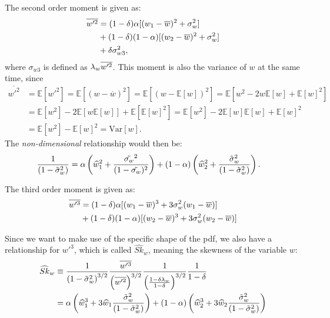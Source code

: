 The second order moment is given as:
\begin{align}
    \label{eq:wp2_bar}
    \overline{w'^2}
    &= (1 - \delta) \alpha [(w_1 - \overline{w})^2 + \sigma_w^2] \nonumber\\
    &+ (1 - \delta) (1 - \alpha) [(w_2 - \overline{w})^2 + \sigma_w^2] \nonumber\\
    &+ \delta \sigma_{w 3}^2,
\end{align}
where $\sigma_{w 3}$ is defined as $\lambda_w \overline{w'^2}$.
This moment is also the variance of $w$ at the same time, since
\begin{align*}
    \overline{w'^2}
    &= \mathbb{E}[w'^2]
    = \mathbb{E}[(w - \overline{w})^2]
    = \mathbb{E}[(w - \mathbb{E}[w])^2]
    = \mathbb{E}[w^2 -2w\mathbb{E}[w] + \mathbb{E}[w]^2] \\
    &= \mathbb{E}[w^2] - 2\mathbb{E}[w\mathbb{E}[w]] + \mathbb{E}[\mathbb{E}[w]^2]
    = \mathbb{E}[w^2] - 2\mathbb{E}[w]\mathbb{E}[w] + \mathbb{E}[w]^2 \\
    &= \mathbb{E}[w^2] - \mathbb{E}[w]^2
    = \text{Var}[w].
\end{align*}
The \emph{non-dimensional} relationship would then be:
\begin{align}
    \label{eq:wp2_bar_non_dim}
    \frac{1}{\left( 1 - \tilde{\sigma}_w^2 \right)}
    &= \alpha \left(\widehat{w}_1^2 + \frac{\tilde{\sigma_w}^2}{(1 - \tilde{\sigma_w})^2} \right)
    + (1-\alpha) \left( \widehat{w}_2^2 + \frac{{\tilde{\sigma}_w}^2}{\left( 1 - \tilde{\sigma}_w^2 \right)} \right).
\end{align}

The third order moment is given as:
\begin{align}
    \label{eq:wp3_bar}
    \overline{w'^3}
    &= (1 - \delta) \alpha [(w_1 - \overline{w})^3 + 3 \sigma_w^2 (w_1 - \overline{w})] \nonumber\\
    &+ (1 - \delta) (1 - \alpha) [(w_2 - \overline{w})^3 + 3 \sigma_w^2 (w_2 - \overline{w})]
\end{align}

Since we want to make use of the specific shape of the \gls{pdf},
we also have a relationship for $w'^3$,
which is called $\widehat{Sk}_w$, meaning the skewness of the variable $w$:
\begin{align}
    \widehat{Sk}_w
    &\equiv \frac{1}{\left( 1 - \tilde{\sigma}_w^2 \right)^{3/2}} \frac{\overline{w'^3}}{\left( \overline{w'^2} \right)^{3/2}}\frac{1}{\left(\frac{1-\delta \lambda_w}{1-\delta}\right)^{3/2}}\frac{1}{1-\delta} \nonumber \\
    &= \alpha \left(\widehat{w}_1^3 + 3 \widehat{w}_1 \frac{{\tilde{\sigma}_w}^2}{\left( 1 - \tilde{\sigma}_w^2 \right)} \right) + (1 - \alpha) \left( \widehat{w}_2^3 + 3 \widehat{w}_2 \frac{{\tilde{\sigma}_w}^2}{\left( 1 - \tilde{\sigma}_w^2 \right)} \right)
    \label{eq:sk_hat_w_nondim}
\end{align}

